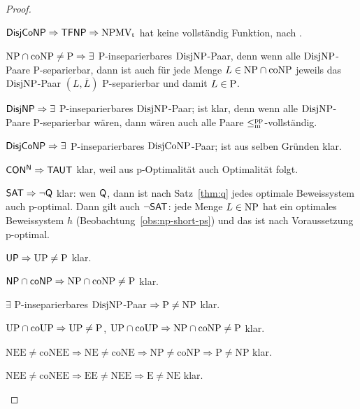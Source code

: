 \begin{proof}
\begin{Prooflist}[nosep]
\item $\hDisjCoNP \Rightarrow \hTFNP \Rightarrow \NPMVt$ hat keine vollständig Funktion, nach \textcite{pudlak_incompleteness_2017}.
\item $\NP\cap\coNP\neq \P \Rightarrow\exists$ P-inseparierbares $\DisjNP$-Paar, denn wenn alle $\DisjNP$-Paare P-separierbar, dann ist auch für jede Menge $L\in\NP\cap\coNP$ jeweils das $\DisjNP$-Paar $(L,\overline{L})$ P-separierbar und damit $L\in\P$.
\item $\hDisjNP \Rightarrow \exists$ P-inseparierbares $\DisjNP$-Paar; ist klar, denn wenn alle $\DisjNP$-Paare P-separierbar wären, dann wären auch alle Paare $\leqmpp$-vollständig.
\item $\hDisjCoNP \Rightarrow \exists$ P-inseparierbares $\DisjCoNP$-Paar; ist aus selben Gründen klar.
\item $\mathsf{CON^N} \Rightarrow \hTAUT$ klar, weil aus p-Optimalität auch Optimalität folgt.
\item $\mathsf \hSAT \Rightarrow \neg\hQ $ klar: wen $\hQ$, dann ist nach Satz~\ref{thm:q} jedes optimale Beweissystem auch p-optimal. Dann gilt auch $\neg\hSAT$: jede Menge $L\in\NP$ hat ein optimales Beweissystem $h$ (Beobachtung~\ref{obs:np-short-ps}) und das ist nach Voraussetzung p-optimal.
\item $\hUP \Rightarrow \UP\neq\P$ klar.
\item $\hNPcoNP \Rightarrow \NP\cap\coNP\neq \P$ klar.
\item $\exists$ P-inseparierbares $\DisjNP$-Paar $\Rightarrow \P\neq \NP$ klar.
\item $\UP\cap\coUP\Rightarrow \UP\neq \P$, $\UP\cap\coUP\Rightarrow \NP\cap\coNP\neq\P$ klar.
\item $\mathrm{NEE\neq coNEE \Rightarrow NE \neq coNE \Rightarrow NP \neq coNP \Rightarrow P\neq NP}$ klar.
\item $\mathrm{NEE\neq coNEE \Rightarrow EE \neq NEE \Rightarrow E\neq NE}$ klar.\qedhere
\end{Prooflist}
\end{proof}

